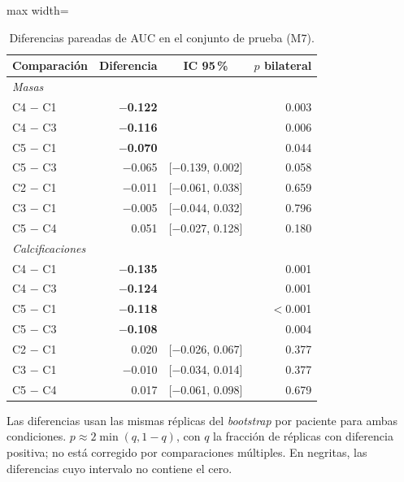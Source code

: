 \begin{table}[H]
\centering
\small
\caption{Diferencias pareadas de AUC en el conjunto de prueba (M7).}
\label{tab:m7_diferencias}
\begin{adjustbox}{max width=\linewidth}
\begin{tabular}{l r c r}
\toprule
Comparación & Diferencia & IC 95\,\% & $p$ bilateral \\
\midrule
\multicolumn{4}{l}{\textit{Masas}} \\
\quad C4 $-$ C1 & \textbf{\boldmath $-$0.122} & \textbf{\boldmath [$-$0.202, $-$0.044]} & 0.003 \\
\quad C4 $-$ C3 & \textbf{\boldmath $-$0.116} & \textbf{\boldmath [$-$0.193, $-$0.041]} & 0.006 \\
\quad C5 $-$ C1 & \textbf{\boldmath $-$0.070} & \textbf{\boldmath [$-$0.140, $-$0.004]} & 0.044 \\
\quad C5 $-$ C3 & $-$0.065 & [$-$0.139, 0.002] & 0.058 \\
\quad C2 $-$ C1 & $-$0.011 & [$-$0.061, 0.038] & 0.659 \\
\quad C3 $-$ C1 & $-$0.005 & [$-$0.044, 0.032] & 0.796 \\
\quad C5 $-$ C4 & 0.051 & [$-$0.027, 0.128] & 0.180 \\
\multicolumn{4}{l}{\textit{Calcificaciones}} \\
\quad C4 $-$ C1 & \textbf{\boldmath $-$0.135} & \textbf{\boldmath [$-$0.208, $-$0.061]} & 0.001 \\
\quad C4 $-$ C3 & \textbf{\boldmath $-$0.124} & \textbf{\boldmath [$-$0.195, $-$0.051]} & 0.001 \\
\quad C5 $-$ C1 & \textbf{\boldmath $-$0.118} & \textbf{\boldmath [$-$0.182, $-$0.046]} & $<$0.001 \\
\quad C5 $-$ C3 & \textbf{\boldmath $-$0.108} & \textbf{\boldmath [$-$0.177, $-$0.035]} & 0.004 \\
\quad C2 $-$ C1 & 0.020 & [$-$0.026, 0.067] & 0.377 \\
\quad C3 $-$ C1 & $-$0.010 & [$-$0.034, 0.014] & 0.377 \\
\quad C5 $-$ C4 & 0.017 & [$-$0.061, 0.098] & 0.679 \\
\bottomrule
\end{tabular}
\end{adjustbox}
\par\smallskip
\parbox{0.95\linewidth}{\footnotesize Las diferencias usan las mismas réplicas del \textit{bootstrap} por paciente para ambas condiciones. $p \approx 2\min(q, 1 - q)$, con $q$ la fracción de réplicas con diferencia positiva; no está corregido por comparaciones múltiples. En negritas, las diferencias cuyo intervalo no contiene el cero.}
\end{table}

